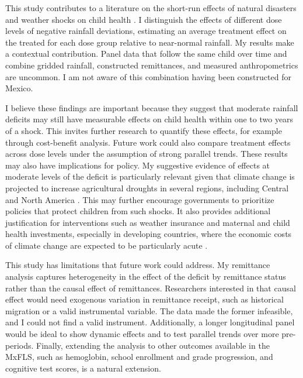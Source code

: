 \documentclass[12pt]{article}
\begin{document}
This study contributes to a literature on the short-run effects of natural disasters and weather shocks on child health \parencite{datarImpactNaturalDisasters2013,hirvonenImpactEthiopias20152020,dodlovaEffects2010Haiti2023}. I distinguish the effects of different dose levels of negative rainfall deviations, estimating an average treatment effect on the treated for each dose group relative to near-normal rainfall. My results make a contextual contribution. Panel data that follow the same child over time and combine gridded rainfall, constructed remittances, and measured anthropometrics are uncommon. I am not aware of this combination having been constructed for Mexico.

I believe these findings are important because they suggest that moderate rainfall deficits may still have measurable effects on child health within one to two years of a shock. This invites further research to quantify these effects, for example through cost-benefit analysis. Future work could also compare treatment effects across dose levels under the assumption of strong parallel trends. These results may also have implications for policy. My suggestive evidence of effects at moderate levels of the deficit is particularly relevant given that climate change is projected to increase agricultural droughts in several regions, including Central and North America \parencite{ipccSummaryPolicymakers2021}. This may further encourage governments to prioritize policies that protect children from such shocks. It also provides additional justification for interventions such as weather insurance and maternal and child health investments, especially in developing countries, where the economic costs of climate change are expected to be particularly acute \parencite{jessoeClimateChangeLabour2018}.

This study has limitations that future work could address. My remittance analysis captures heterogeneity in the effect of the deficit by remittance status rather than the causal effect of remittances. Researchers interested in that causal effect would need exogenous variation in remittance receipt, such as historical migration or a valid instrumental variable. The data made the former infeasible, and I could not find a valid instrument. Additionally, a longer longitudinal panel would be ideal to show dynamic effects and to test parallel trends over more pre-periods. Finally, extending the analysis to other outcomes available in the MxFLS, such as hemoglobin, school enrollment and grade progression, and cognitive test scores, is a natural extension.
\end{document}
